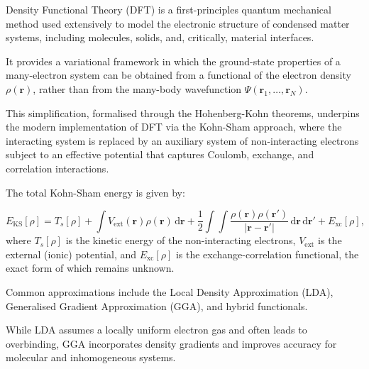 

Density Functional Theory (DFT) is a first-principles quantum mechanical method used extensively to model the electronic
structure of condensed matter systems, including molecules, solids, and, critically, material interfaces\cite{Arantes2007-ea, Leung2020-tv, Di_Liberto2022-gz}.

It provides a variational framework in which the ground-state properties of a many-electron system can be obtained from
a functional of the electron density $\rho(\mathbf{r})$, rather than from the many-body wavefunction
$\Psi(\mathbf{r}_1, \dots, \mathbf{r}_N)$.

This simplification, formalised through the Hohenberg-Kohn theorems, underpins the modern implementation of DFT via the
Kohn-Sham approach, where the interacting system is replaced by an auxiliary system of non-interacting electrons subject
to an effective potential that captures Coulomb, exchange, and correlation interactions\cite{Leung2020-tv}.


The total Kohn-Sham energy is given by:

\begin{equation} E_{\mathrm{KS}}[\rho] = T_s[\rho] + \int V_{\mathrm{ext}}(\mathbf{r}) \rho(\mathbf{r}) \, \mathrm{d}\mathbf{r} + \frac{1}{2} \int \int \frac{\rho(\mathbf{r}) \rho(\mathbf{r'})}{|\mathbf{r} - \mathbf{r'}|} \, \mathrm{d}\mathbf{r} \, \mathrm{d}\mathbf{r'} + E_{\mathrm{xc}}[\rho], \end{equation} where $T_s[\rho]$ is the kinetic energy of the non-interacting electrons, $V_{\mathrm{ext}}$ is the external (ionic) potential, and $E_{\mathrm{xc}}[\rho]$ is the exchange-correlation functional, the exact form of which remains unknown.




Common approximations include the Local Density Approximation (LDA), Generalised Gradient Approximation (GGA), and
hybrid functionals\cite{Arantes2007-ea}.

While LDA assumes a locally uniform electron gas and often leads to overbinding, GGA incorporates density gradients and
improves accuracy for molecular and inhomogeneous systems\cite{Rosen2022-pw}.


